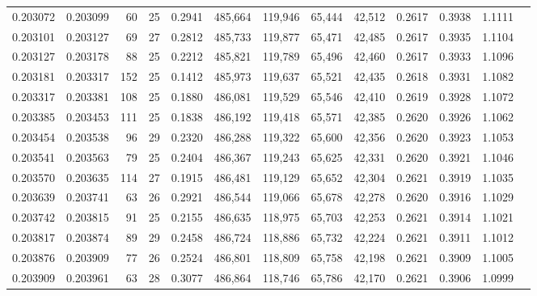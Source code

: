 \begin{tabular}{rrrrrrrrrrrrr}
0.203072 & 0.203099 &  60 &  25 &                                     0.2941 & 485,664 & 119,946 &  65,444 &  42,512 & 0.2617 & 0.3938 & 1.1111 \\
0.203101 & 0.203127 &  69 &  27 &                                     0.2812 & 485,733 & 119,877 &  65,471 &  42,485 & 0.2617 & 0.3935 & 1.1104 \\
0.203127 & 0.203178 &  88 &  25 &                                     0.2212 & 485,821 & 119,789 &  65,496 &  42,460 & 0.2617 & 0.3933 & 1.1096 \\
0.203181 & 0.203317 & 152 &  25 &                                     0.1412 & 485,973 & 119,637 &  65,521 &  42,435 & 0.2618 & 0.3931 & 1.1082 \\
0.203317 & 0.203381 & 108 &  25 &                                     0.1880 & 486,081 & 119,529 &  65,546 &  42,410 & 0.2619 & 0.3928 & 1.1072 \\
0.203385 & 0.203453 & 111 &  25 &                                     0.1838 & 486,192 & 119,418 &  65,571 &  42,385 & 0.2620 & 0.3926 & 1.1062 \\
0.203454 & 0.203538 &  96 &  29 &                                     0.2320 & 486,288 & 119,322 &  65,600 &  42,356 & 0.2620 & 0.3923 & 1.1053 \\
0.203541 & 0.203563 &  79 &  25 &                                     0.2404 & 486,367 & 119,243 &  65,625 &  42,331 & 0.2620 & 0.3921 & 1.1046 \\
0.203570 & 0.203635 & 114 &  27 &                                     0.1915 & 486,481 & 119,129 &  65,652 &  42,304 & 0.2621 & 0.3919 & 1.1035 \\
0.203639 & 0.203741 &  63 &  26 &                                     0.2921 & 486,544 & 119,066 &  65,678 &  42,278 & 0.2620 & 0.3916 & 1.1029 \\
0.203742 & 0.203815 &  91 &  25 &                                     0.2155 & 486,635 & 118,975 &  65,703 &  42,253 & 0.2621 & 0.3914 & 1.1021 \\
0.203817 & 0.203874 &  89 &  29 &                                     0.2458 & 486,724 & 118,886 &  65,732 &  42,224 & 0.2621 & 0.3911 & 1.1012 \\
0.203876 & 0.203909 &  77 &  26 &                                     0.2524 & 486,801 & 118,809 &  65,758 &  42,198 & 0.2621 & 0.3909 & 1.1005 \\
0.203909 & 0.203961 &  63 &  28 &                                     0.3077 & 486,864 & 118,746 &  65,786 &  42,170 & 0.2621 & 0.3906 & 1.0999 \\

\end{tabular}
